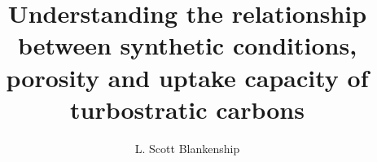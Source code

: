 \documentclass[a4paper,12pt,oneside]{report}
\begin{document}
\symbolfootnote


\title{Understanding the relationship between synthetic conditions, porosity and  uptake capacity of turbostratic carbons}

\makeatletter
\let\inserttitle\@title
\makeatother

\author{L. Scott Blankenship}

\normallinespacing
\maketitle

\preface








\newpage
\tableofcontents

\frontpagestyle


\mainpagestyle





%






\end{document}
